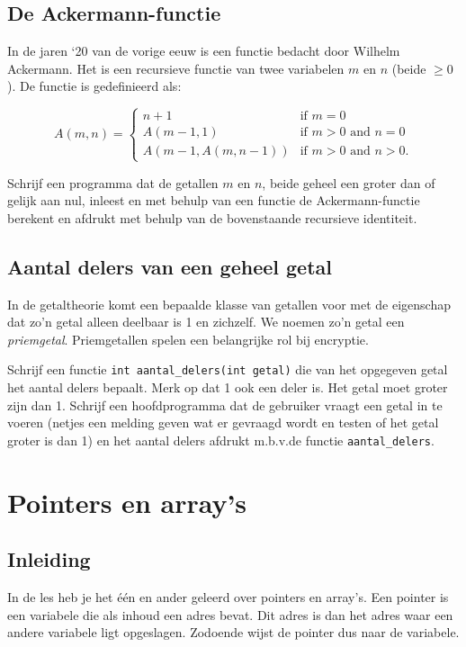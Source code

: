 \documentclass[a4paper,10pt,fleqn,twoside]{article}
\begin{document}
\subsection{ De Ackermann-functie}
In de jaren `20 van de vorige eeuw is een functie bedacht door Wilhelm Ackermann. Het is een recursieve functie van twee variabelen $m$ en $n$ (beide $\geq 0$). De functie is gedefinieerd als:

\begin{equation*}
A(m, n) =
\begin{cases}
n+1 & \mbox{if } m = 0 \\
A(m-1, 1) & \mbox{if } m > 0 \mbox{ and } n = 0 \\
A(m-1, A(m, n-1)) & \mbox{if } m > 0 \mbox{ and } n > 0.
\end{cases}
\end{equation*}

Schrijf een programma dat de getallen $m$ en $n$, beide geheel een groter dan of gelijk aan nul, inleest en met behulp van een functie de Ackermann-functie berekent en afdrukt met behulp van de bovenstaande recursieve identiteit.

\subsection{Aantal delers van een geheel getal}
In de getaltheorie komt een bepaalde klasse van getallen voor met de eigenschap dat zo'n getal alleen deelbaar is 1 en zichzelf. We noemen zo'n getal een \textsl{priemgetal}. Priemgetallen spelen een belangrijke rol bij encryptie.

Schrijf een functie \lstinline|int aantal_delers(int getal)| die van het opgegeven getal het aantal delers bepaalt. Merk op dat 1 ook een deler is. Het getal moet groter zijn dan 1. Schrijf een hoofdprogramma dat de gebruiker vraagt een getal in te voeren (netjes een melding geven wat er gevraagd wordt en testen of het getal groter is dan 1) en het aantal delers afdrukt m.b.v.\@ de functie \lstinline|aantal_delers|.


\section{Pointers en array's}

\subsection{Inleiding}
\label{sec:inleidingpointers}
In de les heb je het één en ander geleerd over pointers en array’s. Een pointer is een variabele die als inhoud een adres bevat. Dit adres is dan het adres waar een andere variabele ligt opgeslagen. Zodoende wijst de pointer dus naar de variabele.
\end{document}
